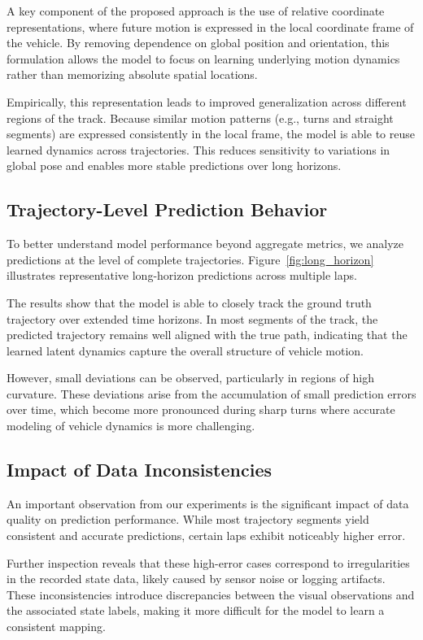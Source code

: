 \documentclass[preprint,12pt]{elsarticle}
\begin{document}
A key component of the proposed approach is the use of relative coordinate representations, where future motion is expressed in the local coordinate frame of the vehicle. By removing dependence on global position and orientation, this formulation allows the model to focus on learning underlying motion dynamics rather than memorizing absolute spatial locations.

Empirically, this representation leads to improved generalization across different regions of the track. Because similar motion patterns (e.g., turns and straight segments) are expressed consistently in the local frame, the model is able to reuse learned dynamics across trajectories. This reduces sensitivity to variations in global pose and enables more stable predictions over long horizons.

\subsection{Trajectory-Level Prediction Behavior}

To better understand model performance beyond aggregate metrics, we analyze predictions at the level of complete trajectories. Figure~\ref{fig:long_horizon} illustrates representative long-horizon predictions across multiple laps.

The results show that the model is able to closely track the ground truth trajectory over extended time horizons. In most segments of the track, the predicted trajectory remains well aligned with the true path, indicating that the learned latent dynamics capture the overall structure of vehicle motion.

However, small deviations can be observed, particularly in regions of high curvature. These deviations arise from the accumulation of small prediction errors over time, which become more pronounced during sharp turns where accurate modeling of vehicle dynamics is more challenging.

\subsection{Impact of Data Inconsistencies}

An important observation from our experiments is the significant impact of data quality on prediction performance. While most trajectory segments yield consistent and accurate predictions, certain laps exhibit noticeably higher error.

Further inspection reveals that these high-error cases correspond to irregularities in the recorded state data, likely caused by sensor noise or logging artifacts. These inconsistencies introduce discrepancies between the visual observations and the associated state labels, making it more difficult for the model to learn a consistent mapping.
\end{document}
